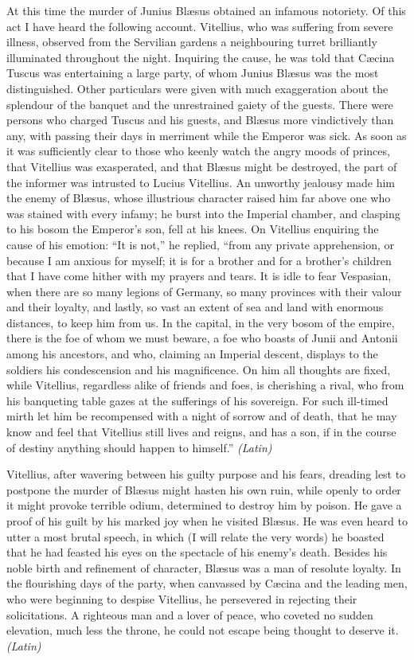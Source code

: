 
At this time the murder of Junius Blæsus obtained an infamous notoriety. Of this act I have heard the following account. Vitellius, who was suffering from severe illness, observed from the Servilian gardens a neighbouring turret brilliantly illuminated throughout the night. Inquiring the cause, he was told that Cæcina Tuscus was entertaining a large party, of whom Junius Blæsus was the most distinguished. Other particulars were given with much exaggeration about the splendour of the banquet and the unrestrained gaiety of the guests. There were persons who charged Tuscus and his guests, and Blæsus more vindictively than any, with passing their days in merriment while the Emperor was sick. As soon as it was sufficiently clear to those who keenly watch the angry moods of princes, that Vitellius was exasperated, and that Blæsus might be destroyed, the part of the informer was intrusted to Lucius Vitellius. An unworthy jealousy made him the enemy of Blæsus, whose illustrious character raised him far above one who was stained with every infamy; he burst into the Imperial chamber, and clasping to his bosom the Emperor's son, fell at his knees. On Vitellius enquiring the cause of his emotion: ``It is not,'' he replied, ``from any private apprehension, or because I am anxious for myself; it is for a brother and for a brother's children that I have come hither with my prayers and tears. It is idle to fear Vespasian, when there are so many legions of Germany, so many provinces with their valour and their loyalty, and lastly, so vast an extent of sea and land with enormous distances, to keep him from us. In the capital, in the very bosom of the empire, there is the foe of whom we must beware, a foe who boasts of Junii and Antonii among his ancestors, and who, claiming an Imperial descent, displays to the soldiers his condescension and his magnificence. On him all thoughts are fixed, while Vitellius, regardless alike of friends and foes, is cherishing a rival, who from his banqueting table gazes at the sufferings of his sovereign. For such ill-timed mirth let him be recompensed with a night of sorrow and of death, that he may know and feel that Vitellius still lives and reigns, and has a son, if in the course of destiny anything should happen to himself.'' \emph{(Latin)}


Vitellius, after wavering between his guilty purpose and his fears, dreading lest to postpone the murder of Blæsus might hasten his own ruin, while openly to order it might provoke terrible odium, determined to destroy him by poison. He gave a proof of his guilt by his marked joy when he visited Blæsus. He was even heard to utter a most brutal speech, in which (I will relate the very words) he boasted that he had feasted his eyes on the spectacle of his enemy's death. Besides his noble birth and refinement of character, Blæsus was a man of resolute loyalty. In the flourishing days of the party, when canvassed by Cæcina and the leading men, who were beginning to despise Vitellius, he persevered in rejecting their solicitations. A righteous man and a lover of peace, who coveted no sudden elevation, much less the throne, he could not escape being thought to deserve it. \emph{(Latin)}

